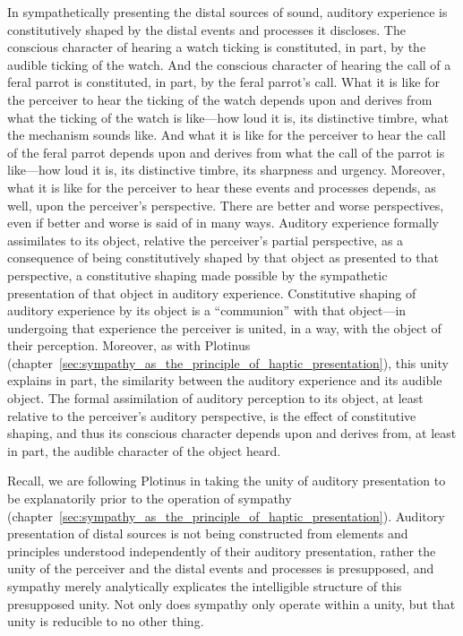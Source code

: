 In sympathetically presenting the distal sources of sound, auditory experience is constitutively shaped by the distal events and processes it discloses. The conscious character of hearing a watch ticking is constituted, in part, by the audible ticking of the watch. And the conscious character of hearing the call of a feral parrot is constituted, in part, by the feral parrot's call. What it is like for the perceiver to hear the ticking of the watch depends upon and derives from what the ticking of the watch is like---how loud it is, its distinctive timbre, what the mechanism sounds like. And what it is like for the perceiver to hear the call of the feral parrot depends upon and derives from what the call of the parrot is like---how loud it is, its distinctive timbre, its sharpness and urgency. Moreover, what it is like for the perceiver to hear these events and processes depends, as well, upon the perceiver's perspective. There are better and worse perspectives, even if better and worse is said of in many ways. Auditory experience formally assimilates to its object, relative the perceiver's partial perspective, as a consequence of being constitutively shaped by that object as presented to that perspective, a constitutive shaping made possible by the sympathetic presentation of that object in auditory experience. Constitutive shaping of auditory experience by its object is a ``communion'' with that object---in undergoing that experience the perceiver is united, in a way, with the object of their perception. Moreover, as with Plotinus (chapter~\ref{sec:sympathy_as_the_principle_of_haptic_presentation}), this unity explains in part, the similarity between the auditory experience and its audible object. The formal assimilation of auditory perception to its object, at least relative to the perceiver's auditory perspective, is the effect of constitutive shaping, and thus its conscious character depends upon and derives from, at least in part, the audible character of the object heard.

Recall, we are following Plotinus in taking the unity of auditory presentation to be explanatorily prior to the operation of sympathy (chapter~\ref{sec:sympathy_as_the_principle_of_haptic_presentation}). Auditory presentation of distal sources is not being constructed from elements and principles understood independently of their auditory presentation, rather the unity of the perceiver and the distal events and processes is presupposed, and sympathy merely analytically explicates the intelligible structure of this presupposed unity. Not only does sympathy only operate within a unity, but that unity is reducible to no other thing.

